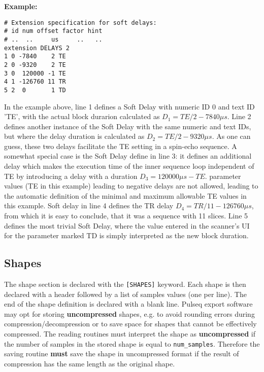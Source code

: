\documentclass{article}
\begin{document}
\begin{minipage}{\textwidth}
\textbf{Example:}
\begin{lstlisting}
# Extension specification for soft delays:
# id num offset factor hint
# ..  ..     us     ..   ..
extension DELAYS 2
1 0 -7840    2 TE
2 0 -9320    2 TE
3 0  120000 -1 TE
4 1 -126760 11 TR
5 2  0       1 TD 
\end{lstlisting}
\end{minipage}

In the example above, line 1 defines a Soft Delay with numeric ID 0 and text ID 'TE', with the actual block durarion calculated as $D_1=TE/2-7840 \mu s$. Line 2 defines another instance of the Soft Delay with the same numeric and text IDs, but where the delay duration is calculated as $D_2=TE/2-9320 \mu s$. As one can guess, these two delays facilitate the TE setting in a spin-echo sequence. A somewhat special case is the Soft Delay define in line 3: it defines an additional delay which makes the execution time of the inner sequence loop independent of TE by introducing a delay with a duration $D_3=120000\mu s - TE$. 
parameter values (TE in this example) leading to negative delays are not allowed, leading to the automatic definition of the minimal and maximum allowable TE values in this example. Soft delay in line 4 defines the TR delay $D_4=TR/11-126760 \mu s$, from which it is easy to conclude, that it was a sequence with 11 slices. Line 5 defines the most trivial Soft Delay, where the value entered in the scanner's UI for the parameter marked TD is simply interpreted as the new block duration. 

\subsection{Shapes}

The shape section is declared with the \verb.[SHAPES]. keyword. Each shape is then declared with a header followed by a list of samples values (one per line). The end of the shape definition is declared with a blank line. Pulseq export software may opt for storing \textbf{uncompressed} shapes, e.g. to avoid rounding errors during compression/decompression or to save space for shapes that cannot be effectively compressed. The reading routines must interpret the shape as \textbf{uncompressed} if the number of samples in the stored shape is equal to \verb.num_samples.. Therefore the saving routine \textbf{must} save the shape in uncompressed format if the result of compression has the same length as the original shape.
\end{document}
